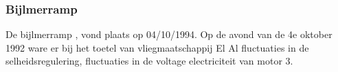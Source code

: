\documentclass{article}
\begin{document}
	\subsubsection{Bijlmerramp}
	De bijlmerramp \cite{aviationsafety04101992airplaneCrashBijlmer},  vond plaats op 04/10/1994. 
	Op de avond van de 4e oktober 1992 ware er bij het toetel van vliegmaatschappij El Al fluctuaties in de selheidsregulering, fluctuaties in de voltage electriciteit van motor 3.
\end{document}

